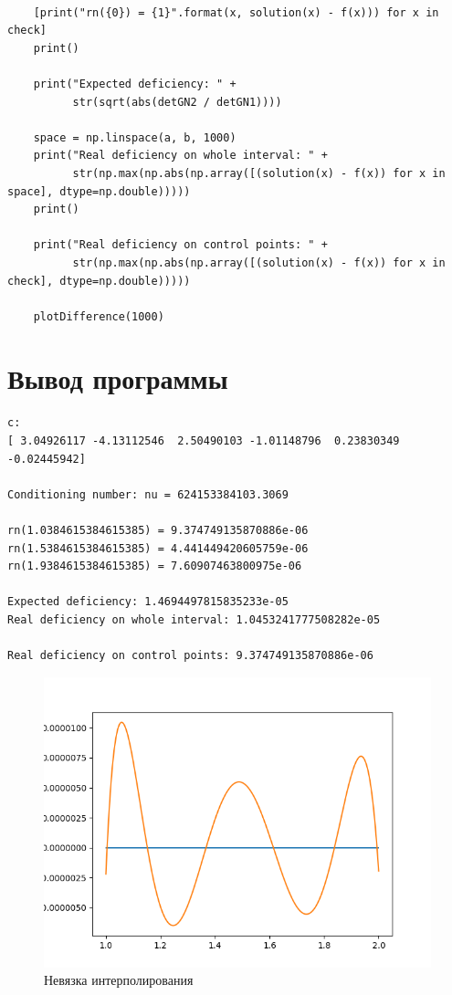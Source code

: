 \documentclass[14pt, a4paper]{article}
\begin{document}
\begin{lstlisting}
    
    [print("rn({0}) = {1}".format(x, solution(x) - f(x))) for x in check]
    print()
    
    print("Expected deficiency: " + 
          str(sqrt(abs(detGN2 / detGN1))))
    
    space = np.linspace(a, b, 1000)
    print("Real deficiency on whole interval: " + 
          str(np.max(np.abs(np.array([(solution(x) - f(x)) for x in space], dtype=np.double)))))
    print()
    
    print("Real deficiency on control points: " + 
          str(np.max(np.abs(np.array([(solution(x) - f(x)) for x in check], dtype=np.double)))))
    
    plotDifference(1000)
\end{lstlisting}

  \section{Вывод программы}
\begin{verbatim}
c:
[ 3.04926117 -4.13112546  2.50490103 -1.01148796  0.23830349 -0.02445942]

Conditioning number: nu = 624153384103.3069

rn(1.0384615384615385) = 9.374749135870886e-06
rn(1.5384615384615385) = 4.441449420605759e-06
rn(1.9384615384615385) = 7.60907463800975e-06

Expected deficiency: 1.4694497815835233e-05
Real deficiency on whole interval: 1.0453241777508282e-05

Real deficiency on control points: 9.374749135870886e-06
\end{verbatim}
\begin{figure}[h!]
  \center
  \includegraphics[width=0.6\linewidth]{lsqDiff.png}
  \caption{Невязка интерполирования}
\end{figure}
\end{document}
